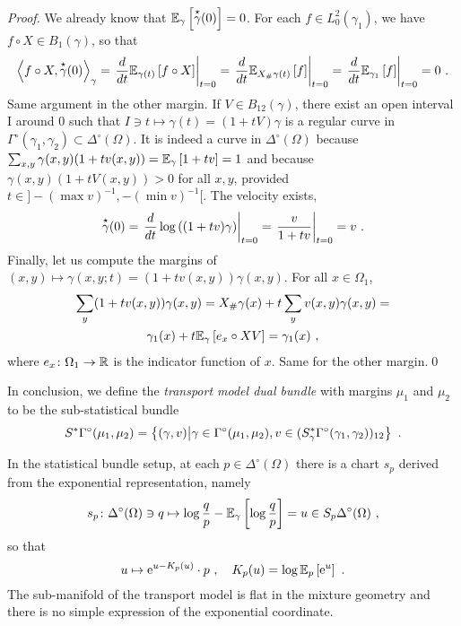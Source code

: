 \documentclass[runningheads]{llncs}
\begin{document}
\begin{proof}
We already know that ${\operatorname{\mathbb E}}_{\gamma}\left[\overset{\star}{\gamma}(0)\right] = 0$. For each $f \in L^2_0(\gamma_1)$, we have $f \circ X \in B_1(\gamma)$, so that 
%
    \begin{equation*}
    \left\langle f \circ X , \overset{\star}{\gamma}(0) \right\rangle_{\gamma} = \left. \frac{d}{dt} {\operatorname{\mathbb E}}_{\gamma(t)}\left[f \circ X\right] \right|_{t=0} = \left. \frac{d}{dt} {\operatorname{\mathbb E}}_{X_{\#}\gamma(t)}\left[f\right] \right|_{t=0} = \left. \frac{d}{dt} {\operatorname{\mathbb E}}_{\gamma_1}\left[f\right] \right|_{t=0} = 0 \ .
    \end{equation*}
%
Same argument in the other margin. 
If $V \in B_{12}(\gamma)$, there exist an open interval I around 0 such that $I \ni t \mapsto \gamma(t) = (1+tV)\gamma$ is a regular curve in $\Gamma^\circ(\gamma_1,\gamma_2) \subset \Delta^\circ(\Omega)$. It is indeed a curve in $\Delta^\circ(\Omega)$ because $\sum_{x,y} \gamma(x,y)(1+tv(x,y)) = {\operatorname{\mathbb E}}_{\gamma}\left[1+tv\right] = 1$ and because $\gamma(x,y)(1+tV(x,y)) > 0$ for all $x,y$, provided $t \in ]- (\max v)^{-1}, - (\min v)^{-1}[$.  The velocity exists,
%
\    \begin{equation*}
     \overset{\star}{\gamma}(0) = \left.  \frac{d}{dt} \log\left( (1+tv)\gamma \right) \right|_{t=0} = \left. \frac v {1+tv} \right|_{t=0} = v \ .
    \end{equation*}
%
Finally, let us compute the margins of $(x,y) \mapsto \gamma(x,y;t) = (1+tv(x,y))\gamma(x,y)$. For all $x \in \Omega_1$,
%
\begin{multline*}
  \sum_y (1+tv(x,y))\gamma(x,y) = X_\# \gamma(x) + t \sum_y v(x,y)\gamma(x,y) = \\ \gamma_1(x) + t {\operatorname{\mathbb E}}_{\gamma}\left[e_x\circ X V\right] = \gamma_1(x) \ ,
\end{multline*}
%
where $e_x \colon \Omega_1 \to \mathbb R$ is the indicator function of $x$. Same for the other margin.\qed
\end{proof}
 
In conclusion, we define the \emph{transport model dual bundle} with margins $\mu_1$ and $\mu_2$ to be the sub-statistical bundle
%
\begin{equation} \label{eq:2}
  S^*\Gamma^\circ(\mu_1,\mu_2) = \left\{ (\gamma,v) \middle| \gamma\in\Gamma^\circ(\mu_1,\mu_2),v \in (S^*_\gamma\Gamma^\circ(\gamma_1,\gamma_2))_{12} \right\} \ .
\end{equation}

In the statistical bundle setup, at each $p \in \Delta^\circ(\Omega)$ there is a chart $s_p$ derived from the exponential representation, namely
\begin{equation*}
 s_p \colon \Delta^\circ(\Omega) \ni q \mapsto \log \frac q p - {\operatorname{\mathbb E}}_{\gamma}\left[\log \frac q p\right] = u \in S_p\Delta^\circ(\Omega) \ ,
\end{equation*}
so that
\begin{equation*}
  u \mapsto \mathrm{e}^{u - K_p(u)} \cdot p \ , \quad K_p(u) = \log {\operatorname{\mathbb E}}_{p}\left[\mathrm{e}^u\right] \ .
\end{equation*}
The sub-manifold of the transport model is flat in the mixture geometry and there is no simple expression of the exponential coordinate.
\end{document}
